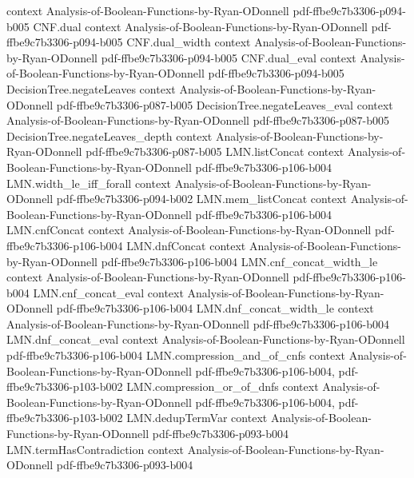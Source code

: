 \begin{lemma}
  {context}
  {Analysis-of-Boolean-Functions-by-Ryan-ODonnell}
  {pdf-ffbe9c7b3306-p094-b005}
\proofstep
  {CNF.dual}
  {context}
  {Analysis-of-Boolean-Functions-by-Ryan-ODonnell}
  {pdf-ffbe9c7b3306-p094-b005}
\proofstep
  {CNF.dual_width}
  {context}
  {Analysis-of-Boolean-Functions-by-Ryan-ODonnell}
  {pdf-ffbe9c7b3306-p094-b005}
\proofstep
  {CNF.dual_eval}
  {context}
  {Analysis-of-Boolean-Functions-by-Ryan-ODonnell}
  {pdf-ffbe9c7b3306-p094-b005}
\proofstep
  {DecisionTree.negateLeaves}
  {context}
  {Analysis-of-Boolean-Functions-by-Ryan-ODonnell}
  {pdf-ffbe9c7b3306-p087-b005}
\proofstep
  {DecisionTree.negateLeaves_eval}
  {context}
  {Analysis-of-Boolean-Functions-by-Ryan-ODonnell}
  {pdf-ffbe9c7b3306-p087-b005}
\proofstep
  {DecisionTree.negateLeaves_depth}
  {context}
  {Analysis-of-Boolean-Functions-by-Ryan-ODonnell}
  {pdf-ffbe9c7b3306-p087-b005}
\proofstep
  {LMN.listConcat}
  {context}
  {Analysis-of-Boolean-Functions-by-Ryan-ODonnell}
  {pdf-ffbe9c7b3306-p106-b004}
\proofstep
  {LMN.width_le_iff_forall}
  {context}
  {Analysis-of-Boolean-Functions-by-Ryan-ODonnell}
  {pdf-ffbe9c7b3306-p094-b002}
\proofstep
  {LMN.mem_listConcat}
  {context}
  {Analysis-of-Boolean-Functions-by-Ryan-ODonnell}
  {pdf-ffbe9c7b3306-p106-b004}
\proofstep
  {LMN.cnfConcat}
  {context}
  {Analysis-of-Boolean-Functions-by-Ryan-ODonnell}
  {pdf-ffbe9c7b3306-p106-b004}
\proofstep
  {LMN.dnfConcat}
  {context}
  {Analysis-of-Boolean-Functions-by-Ryan-ODonnell}
  {pdf-ffbe9c7b3306-p106-b004}
\proofstep
  {LMN.cnf_concat_width_le}
  {context}
  {Analysis-of-Boolean-Functions-by-Ryan-ODonnell}
  {pdf-ffbe9c7b3306-p106-b004}
\proofstep
  {LMN.cnf_concat_eval}
  {context}
  {Analysis-of-Boolean-Functions-by-Ryan-ODonnell}
  {pdf-ffbe9c7b3306-p106-b004}
\proofstep
  {LMN.dnf_concat_width_le}
  {context}
  {Analysis-of-Boolean-Functions-by-Ryan-ODonnell}
  {pdf-ffbe9c7b3306-p106-b004}
\proofstep
  {LMN.dnf_concat_eval}
  {context}
  {Analysis-of-Boolean-Functions-by-Ryan-ODonnell}
  {pdf-ffbe9c7b3306-p106-b004}
\proofstep
  {LMN.compression_and_of_cnfs}
  {context}
  {Analysis-of-Boolean-Functions-by-Ryan-ODonnell}
  {pdf-ffbe9c7b3306-p106-b004,
    pdf-ffbe9c7b3306-p103-b002}
\proofstep
  {LMN.compression_or_of_dnfs}
  {context}
  {Analysis-of-Boolean-Functions-by-Ryan-ODonnell}
  {pdf-ffbe9c7b3306-p106-b004,
    pdf-ffbe9c7b3306-p103-b002}
\proofstep
  {LMN.dedupTermVar}
  {context}
  {Analysis-of-Boolean-Functions-by-Ryan-ODonnell}
  {pdf-ffbe9c7b3306-p093-b004}
\proofstep
  {LMN.termHasContradiction}
  {context}
  {Analysis-of-Boolean-Functions-by-Ryan-ODonnell}
  {pdf-ffbe9c7b3306-p093-b004}

\end{lemma}
